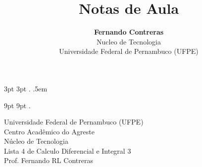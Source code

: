 \theoremstyle{note}
\newtheorem{note}{Note}

  {3pt}%
  {3pt}%
  {\itshape}%
  {}%
  {\bfseries}%
  {.}%
  {.5em}%
  {}%

\theoremstyle{citing}
\newtheorem*{varthm}{}%

  {9pt}%
  {9pt}%
  {\itshape}%
  {}%
  {\bfseries}%
  {.}%
  {\newline}%
  {}%

\theoremstyle{break}
\newtheorem{bthm}{B-Theorem}

\theoremstyle{exercise}
\newtheorem{exer}{Exercise}

\swapnumbers
\theoremstyle{plain}
\newtheorem{thmsw}{Theorem}[section]
\newtheorem{propsw}{Proposition}

\let\lvert=|\let\rvert=|
\newcommand{\Ric}{\mathop{\mathrm{Ric}}\nolimits}

\addtolength{\textwidth}{8pt}

\title{ \textbf{Notas de Aula}}

\author{\textbf{Fernando Contreras}\\
	\large Nucleo de Tecnologia\\
	Universidade Federal de Pernambuco (UFPE)}




	\begin{center}
		Universidade Federal de Pernambuco (UFPE)\\
		Centro Acadêmico do Agreste\\
		Núcleo de Tecnologia\\
		
		Lista 4 de Calculo Diferencial e Integral 3\\
		Prof. Fernando RL Contreras
	\end{center}

